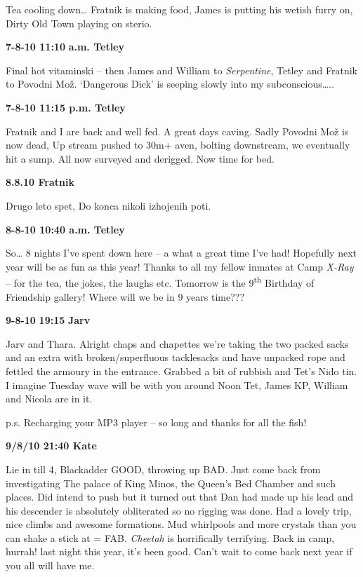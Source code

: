 Tea cooling down\ldots{} Fratnik is making food, James is putting his
wetish furry on, Dirty Old Town playing on sterio.

\textbf{7-8-10 11:10} \textbf{a.m. Tetley}

Final hot vitaminski -- then James and William to \emph{Serpentine},
Tetley and Fratnik to Povodni Mož. `Dangerous Dick' is seeping slowly
into my subconscious\ldots{}..

\textbf{7-8-10 11:15 p.m. Tetley}

Fratnik and I are back and well fed. A great days caving. Sadly Povodni
Mož is now dead, Up stream pushed to 30m+ aven, bolting downstream, we
eventually hit a sump. All now surveyed and derigged. Now time for bed.

\textbf{8.8.10 Fratnik}

Drugo leto spet, Do konca nikoli izhojenih poti.

\textbf{8-8-10 10:40 a.m. Tetley}

So\ldots{} 8 nights I've spent down here -- a what a great time I've
had! Hopefully next year will be as fun as this year! Thanks to all my
fellow inmates at Camp \emph{X-Ray} -- for the tea, the jokes, the
laughs etc. Tomorrow is the 9\textsuperscript{th} Birthday of Friendship
gallery! Where will we be in 9 years time???

\textbf{9-8-10} \textbf{19:15} \textbf{Jarv}

Jarv and Thara. Alright chaps and chapettes we're taking the two packed
sacks and an extra with broken/superfluous tacklesacks and have unpacked
rope and fettled the armoury in the entrance. Grabbed a bit of rubbish
and Tet's Nido tin. I imagine Tuesday wave will be with you around Noon
Tet, James KP, William and Nicola are in it.

p.s. Recharging your MP3 player -- so long and thanks for all the fish!

\textbf{9/8/10 21:40 Kate}

Lie in till 4, Blackadder GOOD, throwing up BAD. Just come back from
investigating The palace of King Minos, the Queen's Bed Chamber and such
places. Did intend to push but it turned out that Dan had made up his
lead and his descender is absolutely obliterated so no rigging was done.
Had a lovely trip, nice climbs and awesome formations. Mud whirlpools
and more crystals than you can shake a stick at = FAB. \emph{Cheetah} is
horrifically terrifying. Back in camp, hurrah! last night this year,
it's been good. Can't wait to come back next year if you all will have
me.

